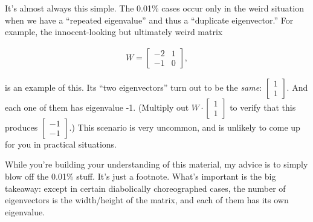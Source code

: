 \smallskip


%

It's almost always this simple. The 0.01\% cases occur only in the weird
situation when we have a ``repeated eigenvalue'' and thus a ``duplicate
eigenvector.'' For example, the innocent-looking but ultimately weird matrix

\label{repeatedEigenvalue}
\vspace{-.25in}
\begin{align*}
W = \begin{bmatrix} -2 & 1 \\ -1 & 0 \end{bmatrix},
\end{align*}
\vspace{-.15in}

is an example of this. Its ``two eigenvectors'' turn out to be the
\textit{same}: {\scriptsize $\begin{bmatrix} 1 \\ 1 \end{bmatrix}$}. And each
one of them has eigenvalue -1. (Multiply out {\scriptsize $W\cdot
\begin{bmatrix} 1 \\ 1 \end{bmatrix}$} to verify that this produces
{\scriptsize $\begin{bmatrix} -1 \\ -1 \end{bmatrix}$}.) This scenario is 
very uncommon, and is unlikely to come up for you in practical situations.


\smallskip

While you're building your understanding of this material, my advice is to
simply blow off the 0.01\% stuff. It's just a footnote. What's important is the
big takeaway: except in certain diabolically choreographed cases, the number of
eigenvectors is the width/height of the matrix, and each of them has its own
eigenvalue.

